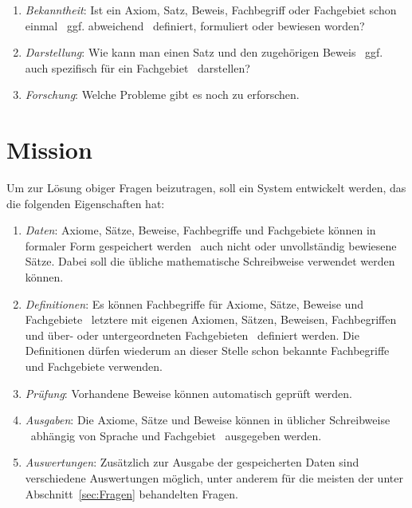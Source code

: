 \documentclass[english,ngerman,parskip=half,headsepline,footsepline]{scrreprt}
\newcounter{Enumi}
\begin{document}
\begin{enumerate}
		\item \label{Frage:Bekanntheit} \emph{Bekanntheit}: Ist ein Axiom, Satz, Beweis, Fachbegriff oder Fachgebiet schon einmal \textendash\ ggf. abweichend \textendash\ definiert, formuliert oder bewiesen worden?
		
		\item \label{Frage:Darstellung} \emph{Darstellung}: Wie kann man einen Satz und den zugehörigen Beweis \textendash\ ggf. auch spezifisch für ein Fachgebiet \textendash\ darstellen?
		
		\item \label{Frage:Forschung} \emph{Forschung}: Welche Probleme gibt es noch zu erforschen.
		
	\end{enumerate}
	
	\section{Mission}
	\label{sec:Mission}
	Um zur Lösung obiger Fragen beizutragen, soll ein System entwickelt werden, das die folgenden Eigenschaften hat:
	
	\begin{enumerate}
		\item \label{Mission:Daten} \emph{Daten}: Axiome, Sätze, Beweise, Fachbegriffe und Fachgebiete können in formaler Form gespeichert werden \textendash\ auch nicht oder unvollständig bewiesene Sätze. Dabei soll die übliche mathematische Schreibweise verwendet werden können.
		
		\item \label{Mission:Definitionen} \emph{Definitionen}: Es können Fachbegriffe für Axiome, Sätze, Beweise und Fachgebiete \textendash\ letztere mit eigenen Axiomen, Sätzen, Beweisen, Fachbegriffen und über- oder untergeordneten Fachgebieten \textendash\ definiert werden. Die Definitionen dürfen wiederum an dieser Stelle schon bekannte Fachbegriffe und Fachgebiete verwenden.
		
		\item \label{Mission:Prüfung} \emph{Prüfung}: Vorhandene Beweise können automatisch geprüft werden.
		
		\item \label{Mission:Ausgaben} \emph{Ausgaben}: Die Axiome, Sätze und Beweise können in üblicher Schreibweise \textendash\ abhängig von Sprache und Fachgebiet \textendash\ ausgegeben werden.
		
		\item \label{Mission:Auswertungen} \emph{Auswertungen}: Zusätzlich zur Ausgabe der gespeicherten Daten sind verschiedene Auswertungen möglich, unter anderem für die meisten der unter Abschnitt~\vref{sec:Fragen} behandelten Fragen.
		
		\setcounter{Enumi}{\value{enumi}}
	\end{enumerate}
\end{document}
